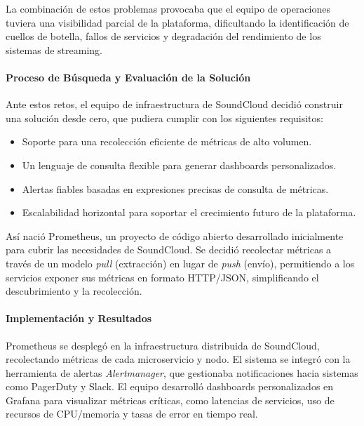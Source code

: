 {                La combinación de estos problemas provocaba que el equipo de operaciones tuviera una visibilidad parcial de la plataforma, dificultando la identificación de cuellos de botella, fallos de servicios y degradación del rendimiento de los sistemas de streaming.
                
                \paragraph{Proceso de Búsqueda y Evaluación de la Solución}  
                Ante estos retos, el equipo de infraestructura de SoundCloud decidió construir una solución desde cero, que pudiera cumplir con los siguientes requisitos:
                \begin{itemize}
                    \item Soporte para una recolección eficiente de métricas de alto volumen.
                    \item Un lenguaje de consulta flexible para generar dashboards personalizados.
                    \item Alertas fiables basadas en expresiones precisas de consulta de métricas.
                    \item Escalabilidad horizontal para soportar el crecimiento futuro de la plataforma.
                \end{itemize}
                
                Así nació Prometheus, un proyecto de código abierto desarrollado inicialmente para cubrir las necesidades de SoundCloud. Se decidió recolectar métricas a través de un modelo \textit{pull} (extracción) en lugar de \textit{push} (envío), permitiendo a los servicios exponer sus métricas en formato HTTP/JSON, simplificando el descubrimiento y la recolección.
                
                \paragraph{Implementación y Resultados}  
                Prometheus se desplegó en la infraestructura distribuida de SoundCloud, recolectando métricas de cada microservicio y nodo. El sistema se integró con la herramienta de alertas \textit{Alertmanager}, que gestionaba notificaciones hacia sistemas como PagerDuty y Slack. El equipo desarrolló dashboards personalizados en Grafana para visualizar métricas críticas, como latencias de servicios, uso de recursos de CPU/memoria y tasas de error en tiempo real.
                
}
